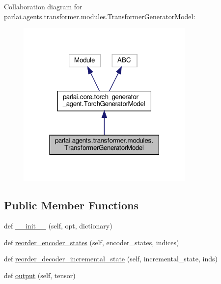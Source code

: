 Collaboration diagram for parlai.\+agents.\+transformer.\+modules.\+Transformer\+Generator\+Model\+:
\nopagebreak
\begin{figure}[H]
\begin{center}
\leavevmode
\includegraphics[width=247pt]{d2/d0d/classparlai_1_1agents_1_1transformer_1_1modules_1_1TransformerGeneratorModel__coll__graph}
\end{center}
\end{figure}
\subsection*{Public Member Functions}
\begin{DoxyCompactItemize}
\item 
def \hyperlink{classparlai_1_1agents_1_1transformer_1_1modules_1_1TransformerGeneratorModel_a17276e3090a132914c0adae133e60357}{\+\_\+\+\_\+init\+\_\+\+\_\+} (self, opt, dictionary)
\item 
def \hyperlink{classparlai_1_1agents_1_1transformer_1_1modules_1_1TransformerGeneratorModel_a9b9261bca59f10692c15cbaaa3ffce65}{reorder\+\_\+encoder\+\_\+states} (self, encoder\+\_\+states, indices)
\item 
def \hyperlink{classparlai_1_1agents_1_1transformer_1_1modules_1_1TransformerGeneratorModel_a7ee3a87dd94d18353bca09990e8d5821}{reorder\+\_\+decoder\+\_\+incremental\+\_\+state} (self, incremental\+\_\+state, inds)
\item 
def \hyperlink{classparlai_1_1agents_1_1transformer_1_1modules_1_1TransformerGeneratorModel_ae0f0d3d038cc12075501aae3a059c997}{output} (self, tensor)
\end{DoxyCompactItemize}
